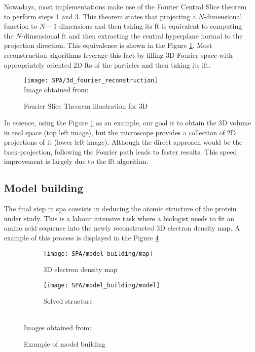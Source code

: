 \documentclass[../main.tex]{subfiles}
\begin{document}
Nowadays, most implementations make use of the Fourier Central Slice theorem to perform steps 1 and 3. This theorem states that projecting a $N$-dimensional function to $N-1$ dimensions and then taking its \gls{ft} is equivalent to computing the $N$-dimensional \gls{ft} and then extracting the central hyperplane normal to the projection direction. This equivalence is shown in the Figure \ref{fig:2:3dfourier}. Most reconstruction algorithms leverage this fact by filling 3D Fourier space with appropriately oriented 2D \glspl{ft} of the particles and then taking its \gls{ift}.

\begin{figure}[htbp]
    \centering
    \texttt{[image: SPA/3d\_fourier\_reconstruction]}\\
    Image obtained from: \cite{nogales2015}
    \caption{Fourier Slice Theorem illustration for 3D}
    \label{fig:2:3dfourier}
\end{figure}

In essence, using the Figure \ref{fig:2:3dfourier} as an example, our goal is to obtain the 3D volume in real space (top left image), but the microscope provides a collection of 2D projections of it (lower left image). Although the direct approach would be the back-projection, following the Fourier path leads to faster results. This speed improvement is largely due to the \gls{fft} algorithm.

\subsection{Model building}
The final step in \gls{spa} consists in deducing the atomic structure of the protein under study. This is a labour intensive task where a biologist needs to fit an amino acid sequence into the newly reconstructed 3D electron density map. A example of this process is displayed in the Figure \ref{fig:2:model_building}

\begin{figure}[htbp]
    \centering
    \begin{subfigure}[b]{0.3\textwidth}
         \centering
         \texttt{[image: SPA/model\_building/map]}
         \caption{3D electron density map}
         \label{fig:2:model_building:map}
    \end{subfigure}
    \begin{subfigure}[b]{0.3\textwidth}
         \centering
         \texttt{[image: SPA/model\_building/model]}
         \caption{Solved structure}
         \label{fig:2:model_building:model}
    \end{subfigure}\\
    Images obtained from: \cite{pfab2020}
    \caption{Example of model building}
    \label{fig:2:model_building}
\end{figure}
\end{document}
